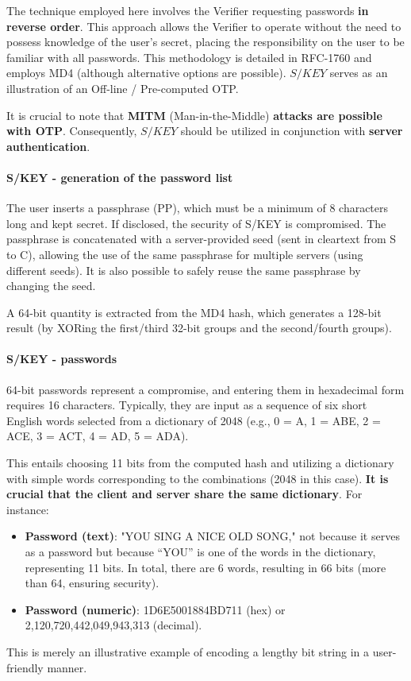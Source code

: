 The technique employed here involves the Verifier requesting passwords \textbf{in reverse order}. This approach allows the Verifier to operate without the need to possess knowledge of the user's secret, placing the responsibility on the user to be familiar with all passwords. This methodology is detailed in RFC-1760 and employs MD4 (although alternative options are possible). \(S/KEY\) serves as an illustration of an Off-line / Pre-computed OTP.

It is crucial to note that \textbf{MITM} (Man-in-the-Middle) \textbf{attacks are possible with OTP}. Consequently, \(S/KEY\) should be utilized in conjunction with \textbf{server authentication}.


\paragraph{S/KEY - generation of the password list}
The user inserts a passphrase (PP), which must be a minimum of 8 characters long and kept secret. If disclosed, the security of S/KEY is compromised. The passphrase is concatenated with a server-provided seed (sent in cleartext from S to C), allowing the use of the same passphrase for multiple servers (using different seeds). It is also possible to safely reuse the same passphrase by changing the seed.

A 64-bit quantity is extracted from the MD4 hash, which generates a 128-bit result (by XORing the first/third 32-bit groups and the second/fourth groups).

\paragraph{S/KEY - passwords}
64-bit passwords represent a compromise, and entering them in hexadecimal form requires 16 characters. Typically, they are input as a sequence of six short English words selected from a dictionary of 2048 (e.g., 0 = A, 1 = ABE, 2 = ACE, 3 = ACT, 4 = AD, 5 = ADA).

This entails choosing 11 bits from the computed hash and utilizing a dictionary with simple words corresponding to the combinations (2048 in this case). \textbf{It is crucial that the client and server share the same dictionary}. For instance:
\begin{itemize}
  \item \textbf{Password (text)}: "YOU SING A NICE OLD SONG," not because it serves as a password but because “YOU” is one of the words in the dictionary, representing 11 bits. In total, there are 6 words, resulting in 66 bits (more than 64, ensuring security).
  \item \textbf{Password (numeric)}: 1D6E5001884BD711 (hex) or 2,120,720,442,049,943,313 (decimal).
\end{itemize}
This is merely an illustrative example of encoding a lengthy bit string in a user-friendly manner.


